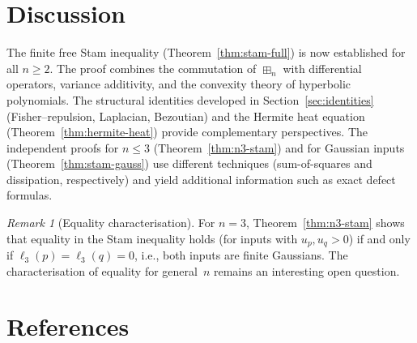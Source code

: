 \documentclass[10pt,a4paper]{amsart}
\theoremstyle{plain}
\theoremstyle{definition}
\theoremstyle{remark}
\newtheorem{remark}[theorem]{Remark}
\newcommand{\fp}{\boxplus_n}
\begin{document}
\section{Discussion}\label{sec:discussion}

The finite free Stam inequality
(Theorem~\ref{thm:stam-full}) is now established
for all $n\ge 2$.
The proof combines the commutation of $\fp$ with
differential operators, variance additivity, and the
convexity theory of hyperbolic polynomials.
The structural identities developed in
Section~\ref{sec:identities}
(Fisher--repulsion, Laplacian, Bezoutian)
and the Hermite heat equation
(Theorem~\ref{thm:hermite-heat}) provide
complementary perspectives.
The independent proofs for $n\le 3$
(Theorem~\ref{thm:n3-stam})
and for Gaussian inputs
(Theorem~\ref{thm:stam-gauss})
use different techniques
(sum-of-squares and dissipation, respectively)
and yield additional information
such as exact defect formulas.

\begin{remark}[Equality characterisation]
For $n=3$, Theorem~\ref{thm:n3-stam} shows
that equality in the Stam inequality holds
(for inputs with $u_p,u_q>0$)
if and only if $\ell_3(p)=\ell_3(q)=0$,
i.e., both inputs are finite Gaussians.
The characterisation of equality for
general~$n$ remains an interesting open question.
\end{remark}


\section*{References}
\end{document}
